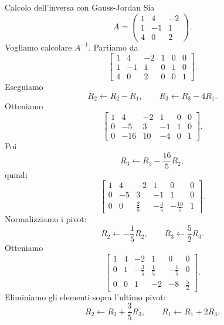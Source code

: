 \documentclass[a4paper]{article}
\begin{document}
\begin{snippetexample}{Calcolo dell'inversa con Gauss-Jordan}
    Sia
    \[
        A=
        \begin{pmatrix}
            1 & 4 & -2\\
            1 & -1 & 1\\
            4 & 0 & 2
        \end{pmatrix}.
    \]
    Vogliamo calcolare \(A^{-1}\). Partiamo da
    \[
        \left[
            \begin{array}{ccc|ccc}
                1 & 4 & -2 & 1 & 0 & 0\\
                1 & -1 & 1 & 0 & 1 & 0\\
                4 & 0 & 2 & 0 & 0 & 1
            \end{array}
        \right].
    \]
    Eseguiamo
    \[
        R_2\longleftarrow R_2-R_1,
        \qquad
        R_3\longleftarrow R_3-4R_1.
    \]
    Otteniamo
    \[
        \left[
            \begin{array}{ccc|ccc}
                1 & 4 & -2 & 1 & 0 & 0\\
                0 & -5 & 3 & -1 & 1 & 0\\
                0 & -16 & 10 & -4 & 0 & 1
            \end{array}
        \right].
    \]
    Poi
    \[
        R_3\longleftarrow R_3-\frac{16}{5}R_2,
    \]
    quindi
    \[
        \left[
            \begin{array}{ccc|ccc}
                1 & 4 & -2 & 1 & 0 & 0\\
                0 & -5 & 3 & -1 & 1 & 0\\
                0 & 0 & \frac{2}{5} & -\frac{4}{5} & -\frac{16}{5} & 1
            \end{array}
        \right].
    \]
    Normalizziamo i pivot:
    \[
        R_2\longleftarrow -\frac{1}{5}R_2,
        \qquad
        R_3\longleftarrow \frac{5}{2}R_3.
    \]
    Otteniamo
    \[
        \left[
            \begin{array}{ccc|ccc}
                1 & 4 & -2 & 1 & 0 & 0\\
                0 & 1 & -\frac{3}{5} & \frac{1}{5} & -\frac{1}{5} & 0\\
                0 & 0 & 1 & -2 & -8 & \frac{5}{2}
            \end{array}
        \right].
    \]
    Eliminiamo gli elementi sopra l'ultimo pivot:
    \[
        R_2\longleftarrow R_2+\frac{3}{5}R_3,
        \qquad
        R_1\longleftarrow R_1+2R_3.
\]
\end{snippetexample}
\end{document}

